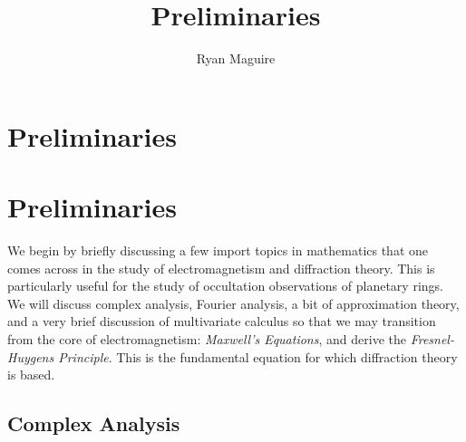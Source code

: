 \documentclass[crop=false,class=book,oneside]{standalone}
\begin{document}
    \ifx\ifplanetdiff\undefined
        \title{Preliminaries}
        \author{Ryan Maguire}
        \date{\vspace{-5ex}}
        \maketitle
        \tableofcontents
        \clearpage
        \chapter{Preliminaries}
    \else
        \chapter{Preliminaries}
    \fi
    We begin by briefly discussing a few import topics in
    mathematics that one comes across in the study of
    electromagnetism and diffraction theory. This is
    particularly useful for the study of occultation
    observations of planetary rings. We will discuss complex
    analysis, Fourier analysis, a bit of approximation theory,
    and a very brief discussion of multivariate calculus so
    that we may transition from the core of electromagnetism:
    \textit{Maxwell's Equations}, and derive the
    \textit{Fresnel-Huygens Principle}. This is the fundamental
    equation for which diffraction theory is based.
    \section{Complex Analysis}
\end{document}
